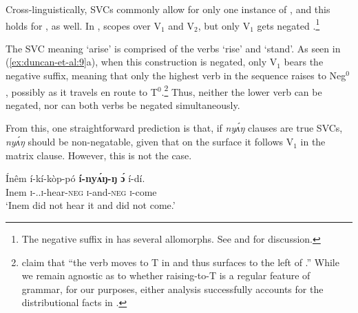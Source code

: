\documentclass[output=paper,modfonts,nonflat,
]{langsci/langscibook}
\begin{document}
Cross-linguistically, SVCs commonly allow for only one instance of  \citep{hiraiwa2008object}, and this holds for , as well. In ,  scopes over V$_1$ and V$_2$, but only V$_1$ gets negated \citep{major2015serial}.\footnote{The negative suffix in  has several allomorphs. See \citet[124-127]{akinlabi2003} and \citet[89]{duncan2016parallel} for discussion.}

\ea\label{ex:duncan-et-al:9}
\z
\z

\noindent The SVC meaning `arise' is comprised of the verbs `rise' and `stand'. As seen in (\ref{ex:duncan-et-al:9}a), when this construction is negated, only V$_1$ bears the negative suffix, meaning that only the highest verb in the sequence raises to Neg$^0$ \citep{duncan-toappear}, possibly as it travels en route to T$^0$.\footnote{\citet[120]{baker2010agreement} claim that ``the verb moves to T in  and thus surfaces to the left of .'' While we remain agnostic as to whether raising-to-T is a regular feature of  grammar, for our purposes, either analysis successfully accounts for the distributional facts in .} Thus, neither the lower verb can be negated, nor can both verbs be negated simultaneously. 

From this, one straightforward prediction is that, if \textit{ny\'{ʌ}ŋ} clauses are true SVCs, \textit{ny\'{ʌ}ŋ} should be non-negatable, given that on the surface it follows V$_1$ in the matrix clause. However, this is not the case.

\ea\label{ex:duncan-et-al:10}
\gll \'{I}nêm í-kí-k\`{o}p-pó \textbf{í-ny\'{ʌ}ŋ-ŋ \'ɔ} í-dí. \\
Inem \textsc{i}-{\PST.\FOC}.\textsc{i}-hear-\textsc{neg} \textsc{i}-and-\textsc{neg} \textsc{i}-come \\
\glt ‘Inem did not hear it and did not come.’ \citep[86]{essien1985negation}
\z
\end{document}
